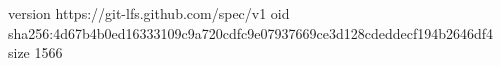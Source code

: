 version https://git-lfs.github.com/spec/v1
oid sha256:4d67b4b0ed16333109c9a720cdfc9e07937669ce3d128cdeddecf194b2646df4
size 1566
